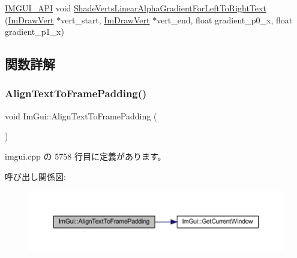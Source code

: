 \begin{DoxyCompactItemize}
\item 
\mbox{\hyperlink{imgui_8h_a43829975e84e45d1149597467a14bbf5}{I\+M\+G\+U\+I\+\_\+\+A\+PI}} void \mbox{\hyperlink{namespace_im_gui_a73b4d230c8fffd2a07d799cd9d4e2a03}{Shade\+Verts\+Linear\+Alpha\+Gradient\+For\+Left\+To\+Right\+Text}} (\mbox{\hyperlink{struct_im_draw_vert}{Im\+Draw\+Vert}} $\ast$vert\+\_\+start, \mbox{\hyperlink{struct_im_draw_vert}{Im\+Draw\+Vert}} $\ast$vert\+\_\+end, float gradient\+\_\+p0\+\_\+x, float gradient\+\_\+p1\+\_\+x)
\end{DoxyCompactItemize}


\subsection{関数詳解}
\mbox{\label{namespace_im_gui_ae14be3a3bec106de7c91aaa2a9a558a1}} 
\subsubsection{\texorpdfstring{Align\+Text\+To\+Frame\+Padding()}{AlignTextToFramePadding()}}
{\footnotesize\ttfamily void Im\+Gui\+::\+Align\+Text\+To\+Frame\+Padding (\begin{DoxyParamCaption}{ }\end{DoxyParamCaption})}



 imgui.\+cpp の 5758 行目に定義があります。

呼び出し関係図\+:\nopagebreak
\begin{figure}[H]
\begin{center}
\leavevmode
\includegraphics[width=350pt]{namespace_im_gui_ae14be3a3bec106de7c91aaa2a9a558a1_cgraph}
\end{center}
\end{figure}
\mbox{\label{namespace_im_gui_ac7c2bd67d2bb2d8ee4b583b1576a0bd3}} 
